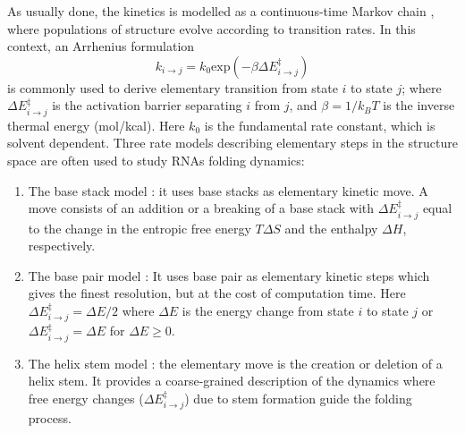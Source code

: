 As usually done, the kinetics is modelled as a continuous-time Markov chain \cite{lorenz20_effic_comput_base_probab_multi_rna_foldin}, where populations of structure evolve according to transition rates. In this context, an Arrhenius formulation 
\begin{equation}
	\label{Eq:arrhenius}
	k_{i \rightarrow j} = k_0 \text{exp}(-\beta  \Delta E^{\ddagger}_{i\rightarrow j})
\end{equation}
is commonly used to derive elementary transition from state $i$ to state $j$; where \(\Delta E^{\ddagger}_{i \rightarrow j}\) is the activation barrier separating \(i\) from \(j\), and \(\beta=1/k_BT\) is the inverse thermal energy (mol/kcal). 
Here \(k_0\) is the fundamental rate constant, which is solvent dependent.
Three rate models describing elementary steps in the structure space are often used to study RNAs folding dynamics: 
\begin{enumerate}
	\item The base stack model \cite{zhang02_rna_hairp_foldin_kinet,zhang2003analyzing,zhang2006exploring}: it uses base stacks as elementary kinetic move. A move consists of an addition or a breaking of a base stack with \(\Delta E^{\ddagger}_{i \rightarrow j}\) equal to the change in the entropic free energy $T\Delta S$ and the enthalpy $\Delta H$, respectively.  
	\item The base pair model \cite{flamm2000rna,cocco2003slow}: It uses base pair as elementary kinetic steps which gives the finest resolution, but at the cost of computation time. Here \(\Delta E^{\ddagger}_{i \rightarrow j}= \Delta E/2\) where $\Delta E$ is the energy change from state $i$ to state $j$ or $ \Delta E^{\ddagger}_{i \rightarrow j}= \Delta E$ for $\Delta E \geq 0$.
	\item  The helix stem model \cite{martinez84_rna_foldin_rule, isambert2000modeling}:  the elementary move is the creation or deletion of a helix stem. It provides a coarse-grained description of the dynamics where free energy changes (\(\Delta E^{\ddagger}_{i \rightarrow j}\)) due to stem formation guide the folding process. 
\end{enumerate}

